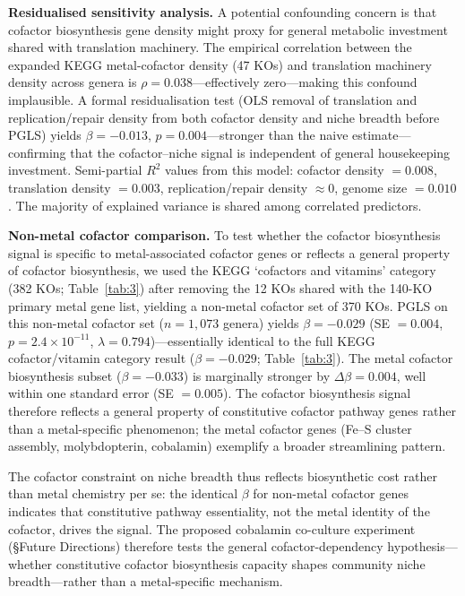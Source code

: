 \documentclass[times]{zHenriquesLab-StyleBioRxiv}
\begin{document}
\textbf{Residualised sensitivity analysis.} A potential
confounding concern is that cofactor biosynthesis gene density might proxy for
general metabolic investment shared with translation machinery. The empirical
correlation between the expanded KEGG metal-cofactor density (47 KOs) and
translation machinery density across genera is $\rho = 0.038$---effectively
zero---making this confound implausible. A formal residualisation test (OLS
removal of translation and replication/repair density from both cofactor density
and niche breadth before PGLS) yields $\beta = -0.013$, $p = 0.004$---stronger
than the naive estimate---confirming that the cofactor--niche signal is
independent of general housekeeping investment. Semi-partial $R^2$ values from
this model: cofactor density $= 0.008$, translation density $= 0.003$,
replication/repair density $\approx 0$, genome size $= 0.010$. The majority of
explained variance is shared among correlated predictors.


\textbf{Non-metal cofactor comparison.} To test whether the cofactor
biosynthesis signal is specific to metal-associated cofactor genes or reflects
a general property of cofactor biosynthesis, we used the KEGG `cofactors and
vitamins' category (382 KOs; Table~\ref{tab:3}) after removing the 12 KOs
shared with the 140-KO primary metal gene list, yielding a non-metal cofactor
set of 370 KOs. PGLS on this non-metal cofactor set ($n = 1{,}073$ genera)
yields $\beta = -0.029$ (SE $= 0.004$, $p = 2.4 \times 10^{-11}$,
$\lambda = 0.794$)---essentially identical to the full KEGG cofactor/vitamin
category result ($\beta = -0.029$; Table~\ref{tab:3}). The metal cofactor
biosynthesis subset ($\beta = -0.033$) is marginally stronger by $\Delta\beta
= 0.004$, well within one standard error (SE $= 0.005$). The cofactor
biosynthesis signal therefore reflects a general property of constitutive
cofactor pathway genes rather than a metal-specific phenomenon; the metal
cofactor genes (Fe--S cluster assembly, molybdopterin, cobalamin) exemplify
a broader streamlining pattern.

The cofactor constraint on niche breadth thus reflects biosynthetic cost rather
than metal chemistry per se: the identical $\beta$ for non-metal cofactor genes
indicates that constitutive pathway essentiality, not the metal identity of the
cofactor, drives the signal. The proposed cobalamin co-culture experiment
(\S Future Directions) therefore tests the general cofactor-dependency
hypothesis---whether constitutive cofactor biosynthesis capacity shapes community
niche breadth---rather than a metal-specific mechanism.
\end{document}

